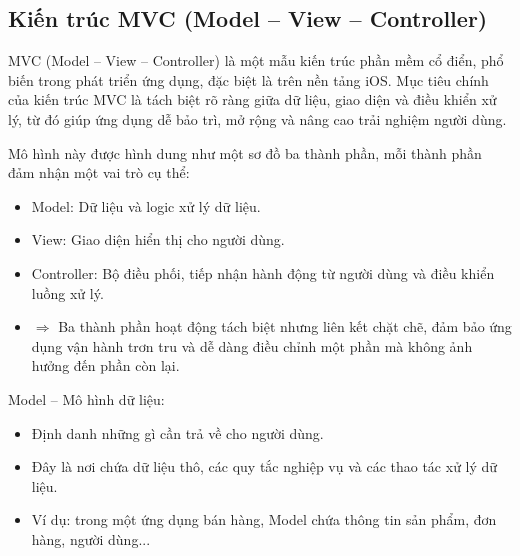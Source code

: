 \subsection{Kiến trúc MVC (Model – View – Controller)}
\renewcommand{\labelitemi}{--}    
    \begin{flushleft}
        \hspace*{0.8cm}MVC (Model – View – Controller) là một mẫu kiến trúc phần mềm cổ điển, phổ biến trong phát triển ứng dụng, đặc biệt là trên nền tảng iOS. Mục tiêu chính của kiến trúc MVC là tách biệt rõ ràng giữa dữ liệu, giao diện và điều khiển xử lý, từ đó giúp ứng dụng dễ bảo trì, mở rộng và nâng cao trải nghiệm người dùng.
    \end{flushleft}

    \begin{flushleft}
      \hspace*{0.8cm}Mô hình này được hình dung như một sơ đồ ba thành phần, mỗi thành phần đảm nhận một vai trò cụ thể:
      \setlength{\leftmargini}{1.5cm}
      \begin{itemize}
          \item Model: Dữ liệu và logic xử lý dữ liệu.
          \item View: Giao diện hiển thị cho người dùng.
          \item Controller: Bộ điều phối, tiếp nhận hành động từ người dùng và điều khiển luồng xử lý.
          \item[]$\Rightarrow$ Ba thành phần hoạt động tách biệt nhưng liên kết chặt chẽ, đảm bảo ứng dụng vận hành trơn tru và dễ dàng điều chỉnh một phần mà không ảnh hưởng đến phần còn lại.
      \end{itemize}
    \end{flushleft}

    \begin{flushleft}
      \hspace*{0.8cm}Model – Mô hình dữ liệu:
      \setlength{\leftmargini}{1.5cm}
      \begin{itemize}
          \item Định danh những gì cần trả về cho người dùng.
          \item Đây là nơi chứa dữ liệu thô, các quy tắc nghiệp vụ và các thao tác xử lý dữ liệu.
          \item Ví dụ: trong một ứng dụng bán hàng, Model chứa thông tin sản phẩm, đơn hàng, người dùng...
      \end{itemize}
    \end{flushleft}


